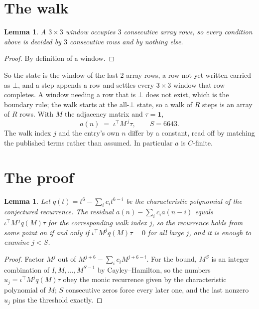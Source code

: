 \documentclass[11pt,a4paper]{article}
\theoremstyle{plain}
\newtheorem{lemma}[theorem]{Lemma}
\theoremstyle{definition}
\begin{document}
\section{The walk}

\begin{lemma}\label{lem:win}
A $3\times3$ window occupies $3$ consecutive array rows, so every condition above is
decided by $3$ consecutive rows and by nothing else.
\end{lemma}

\begin{proof}
By definition of a window.
\end{proof}

So the state is the window of the last $2$ array rows, a row not yet written carried as
$\bot$, and a step appends a row and settles every $3\times3$ window that row completes. A
window needing a row that is $\bot$ does not exist, which is the boundary rule; the walk starts
at the all-$\bot$ state, so a walk of $R$ steps is an array of $R$ rows. With $M$ the adjacency
matrix and $\tau=\mathbf{1}$,
\[
a(n)\;=\;\iota^{\!\top}M^{\,j}\tau ,\qquad S=6643.
\]
The walk index $j$ and the entry's own $n$ differ by a constant, read off by matching the
published terms rather than assumed. In particular $a$ is $C$-finite.

\section{The proof}

\begin{lemma}\label{lem:crit}
Let $q(t)=t^{6}-\sum_i c_it^{6-i}$ be the characteristic polynomial of the
conjectured recurrence. The residual $a(n)-\sum_ic_ia(n-i)$ equals
$\iota^{\!\top}M^{\,j}q(M)\tau$ for the corresponding walk index $j$, so the recurrence
holds from some point on if and only if $\iota^{\!\top}M^{j}q(M)\tau=0$ for all large $j$,
and it is enough to examine $j<S$.
\end{lemma}

\begin{proof}
Factor $M^{j}$ out of $M^{j+6}-\sum_ic_iM^{j+6-i}$. For the bound, $M^{S}$
is an integer combination of $I,M,\dots,M^{S-1}$ by Cayley--Hamilton, so the numbers
$u_j=\iota^{\!\top}M^{j}q(M)\tau$ obey the monic recurrence given by the characteristic
polynomial of $M$; $S$ consecutive zeros force every later one, and the last nonzero $u_j$
pins the threshold exactly.
\end{proof}
\end{document}
